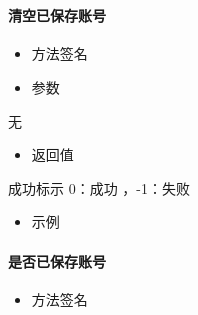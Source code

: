 \documentclass[letterpaper,10pt,english]{sphinxmanual}
\begin{document}
​


\paragraph{清空已保存账号}
\label{\detokenize{csharp:id24}}\begin{itemize}
\item {} 
方法签名

\end{itemize}

%
\begin{sphinxVerbatim}[commandchars=\\\{\}]
  
\end{sphinxVerbatim}
\begin{itemize}
\item {} 
参数

\end{itemize}

无
\begin{itemize}
\item {} 
返回值

\end{itemize}

成功标示 0：成功 ，-1：失败
\begin{itemize}
\item {} 
示例

\end{itemize}

%
\begin{sphinxVerbatim}[commandchars=\\\{\}]
   
   
  
   
   
   
\end{sphinxVerbatim}


\paragraph{是否已保存账号}
\label{\detokenize{csharp:id25}}\begin{itemize}
\item {} 
方法签名

\end{itemize}
\end{document}
